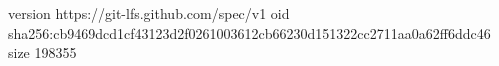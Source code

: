 version https://git-lfs.github.com/spec/v1
oid sha256:cb9469dcd1cf43123d2f0261003612cb66230d151322cc2711aa0a62ff6ddc46
size 198355
